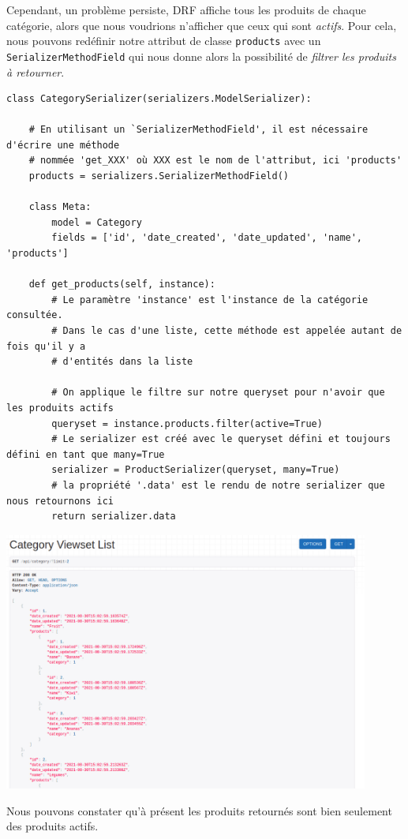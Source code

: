 \documentclass[a4paper]{article}
\begin{document}
Cependant, un problème persiste, DRF affiche tous les produits de chaque catégorie, alors que nous voudrions n'afficher que ceux qui sont {\em actifs}. Pour cela, nous pouvons redéfinir notre attribut de classe {\tt products}  avec un {\tt SerializerMethodField}  qui nous donne alors la possibilité de {\em filtrer les produits à retourner}.
\begin{verbatim}
class CategorySerializer(serializers.ModelSerializer):

    # En utilisant un `SerializerMethodField', il est nécessaire d'écrire une méthode
    # nommée 'get_XXX' où XXX est le nom de l'attribut, ici 'products'
    products = serializers.SerializerMethodField()

    class Meta:
        model = Category
        fields = ['id', 'date_created', 'date_updated', 'name', 'products']

    def get_products(self, instance):
        # Le paramètre 'instance' est l'instance de la catégorie consultée.
        # Dans le cas d'une liste, cette méthode est appelée autant de fois qu'il y a
        # d'entités dans la liste

        # On applique le filtre sur notre queryset pour n'avoir que les produits actifs
        queryset = instance.products.filter(active=True)
        # Le serializer est créé avec le queryset défini et toujours défini en tant que many=True
        serializer = ProductSerializer(queryset, many=True)
        # la propriété '.data' est le rendu de notre serializer que nous retournons ici
        return serializer.data
\end{verbatim}

\begin{center}
\includegraphics[width=12cm]{images/image13.png}
\end{center}
Nous pouvons constater qu'à présent les produits retournés sont bien seulement des produits actifs.
\end{document}
